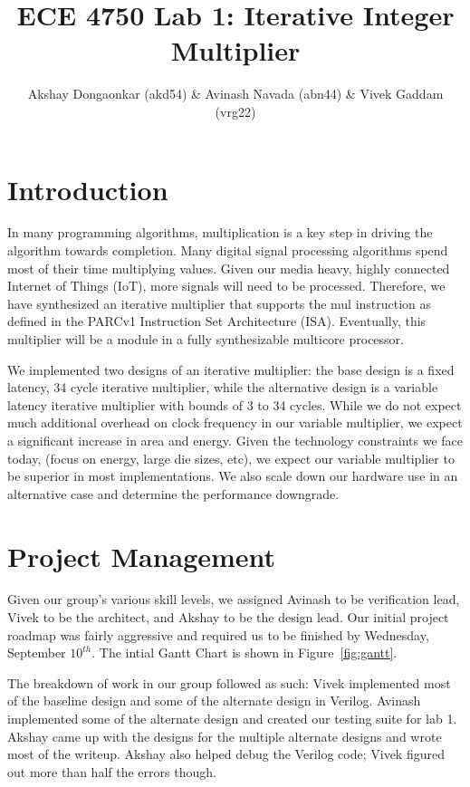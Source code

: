 \documentclass[11pt]{article}
\begin{document}
\title{ECE 4750 Lab 1: Iterative Integer Multiplier}
\author{Akshay Dongaonkar (akd54) \& Avinash Navada (abn44) \& Vivek Gaddam (vrg22)}
\maketitle

\section{Introduction}

In many programming algorithms, multiplication is a key step in driving the algorithm towards completion. 
Many digital signal processing algorithms spend most of their time multiplying values. 
Given our media heavy, highly connected Internet of Things (IoT), more signals will need to be processed.
Therefore, we have synthesized an iterative multiplier that supports the mul instruction as defined in the PARCv1 Instruction Set Architecture (ISA).
Eventually, this multiplier will be a module in a fully synthesizable multicore processor.

We implemented two designs of an iterative multiplier: the base design is a fixed latency, 34 cycle iterative multiplier, while the alternative design is a variable latency iterative multiplier with bounds of 3 to 34 cycles.
While we do not expect much additional overhead on clock frequency in our variable multiplier,
we expect a significant increase in area and energy.
Given the technology constraints we face today, (focus on energy, large die sizes, etc),
we expect our variable multiplier to be superior in most implementations.
We also scale down our hardware use in an alternative case and determine the performance downgrade.  


\section{Project Management}

Given our group's various skill levels, we assigned Avinash to be verification lead, Vivek to be the architect, and Akshay to be the design lead.
Our initial project roadmap was fairly aggressive and required us to be finished by Wednesday, September $10^{th}$.
The intial Gantt Chart is shown in Figure~\ref{fig:gantt}.

The breakdown of work in our group followed as such:
Vivek implemented most of the baseline design and some of the alternate design in Verilog. 
Avinash implemented some of the alternate design and created our testing suite for lab 1.
Akshay came up with the designs for the multiple alternate designs and wrote most of the writeup.
Akshay also helped debug the Verilog code; Vivek figured out more than half the errors though.
\end{document}
